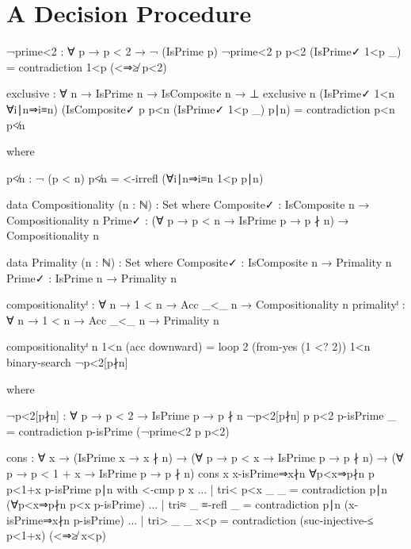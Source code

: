\documentclass[./Thesis.tex]{subfiles}
\begin{document}
\section{A Decision Procedure}
\label{sec:a-decision-procedure}
\begin{code}
  ¬prime<2 : ∀ p → p < 2 → ¬ (IsPrime p)
  ¬prime<2 p p<2 (IsPrime✓ 1<p _) = contradiction 1<p (<⇒≱ p<2)
\end{code}
\begin{code}
  exclusive : ∀ {n} → IsPrime n → IsComposite n → ⊥
  exclusive {n} (IsPrime✓ 1<n ∀i∣n⇒i≡n) (IsComposite✓ p p<n (IsPrime✓ 1<p _) p∣n)
    = contradiction p<n p≮n
\end{code}
\begin{code}[hide]
    where
\end{code}
\begin{code}
    p≮n : ¬ (p < n)
    p≮n = <-irrefl (∀i∣n⇒i≡n 1<p p∣n)
\end{code}
\begin{code}
  data Compositionality (n : ℕ) : Set where
    Composite✓ : IsComposite n → Compositionality n
    Prime✓ : (∀ {p} → p < n → IsPrime p → p ∤ n) → Compositionality n
\end{code}
\begin{code}
  data Primality (n : ℕ) : Set where
    Composite✓ : IsComposite n → Primality n
    Prime✓ : IsPrime n → Primality n
\end{code}
\begin{code}
  compositionalityⁱ : ∀ n → 1 < n → Acc _<_ n → Compositionality n
  primalityⁱ : ∀ n → 1 < n → Acc _<_ n → Primality n
\end{code}
\begin{code}
  compositionalityⁱ n 1<n (acc downward)
    = loop 2 (from-yes (1 <? 2)) 1<n binary-search ¬p<2[p∤n]
\end{code}
\begin{code}[hide]
    where
\end{code}
\begin{code}
    ¬p<2[p∤n] : ∀ {p} → p < 2 → IsPrime p → p ∤ n
    ¬p<2[p∤n] {p} p<2 p-isPrime _ = contradiction p-isPrime (¬prime<2 p p<2)
\end{code}
\begin{code}
    cons
      : ∀ {x}
      → (IsPrime x → x ∤ n)
      → (∀ {p} → p < x → IsPrime p → p ∤ n)
      → (∀ {p} → p < 1 + x → IsPrime p → p ∤ n)
    cons {x} x-isPrime⇒x∤n ∀p<x⇒p∤n {p} p<1+x p-isPrime p∣n with <-cmp p x
    ... | tri< p<x _ _ = contradiction p∣n (∀p<x⇒p∤n p<x p-isPrime)
    ... | tri≈ _ ≡-refl _ = contradiction p∣n (x-isPrime⇒x∤n p-isPrime)
    ... | tri> _ _ x<p = contradiction (suc-injective-≤ p<1+x) (<⇒≱ x<p)
\end{code}
\end{document}
